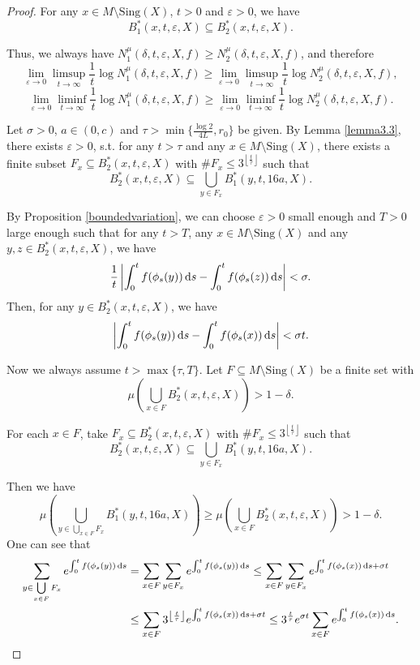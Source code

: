 \documentclass[10pt]{article}
\newtheorem*{Theorem A}{Theorem A}
\begin{document}
\begin{proof} For any \( x \in M \setminus \text{Sing}(X) \), \( t > 0 \) and \( \varepsilon > 0 \), we have
\[
B_1^*(x, t, \varepsilon, X) \subseteq B_2^*(x, t, \varepsilon, X).
\]

\noindent
Thus, we always have \( N_1^\mu(\delta, t, \varepsilon, X, f) \geq N_2^\mu(\delta, t, \varepsilon, X, f) \), and therefore
\[
\lim_{\varepsilon \to 0} \limsup_{t \to \infty} \frac{1}{t} \log N_1^\mu(\delta, t, \varepsilon, X, f) \geq \lim_{\varepsilon \to 0} \limsup_{t \to \infty} \frac{1}{t} \log N_2^\mu(\delta, t, \varepsilon, X, f),
\]
\[
\lim_{\varepsilon \to 0} \liminf_{t \to \infty} \frac{1}{t} \log N_1^\mu(\delta, t, \varepsilon, X, f) \geq \lim_{\varepsilon \to 0} \liminf_{t \to \infty} \frac{1}{t} \log N_2^\mu(\delta, t, \varepsilon, X, f).
\]

Let \( \sigma > 0 \), \(a\in(0,c)\) and  \( \tau > \min\{\frac{\log 2}{4L}, r_0\} \) be given. By Lemma \ref{lemma3.3}, there exists \( \varepsilon > 0 \), s.t. for any \( t > \tau \) and any \( x \in M \setminus \text{Sing}(X) \), there exists a finite subset \( F_x \subseteq B_2^*(x, t, \varepsilon, X) \) with \( \#F_x \leq 3^{\left\lfloor \frac{t}{\tau} \right\rfloor} \) such that
\[
B_2^*(x, t, \varepsilon, X) \subseteq \bigcup_{y \in F_x} B_1^*(y, t, 16a, X).
\]

By Proposition \ref{boundedvariation}, we can choose \( \varepsilon > 0 \) small enough and \( T>0\) large enough such that for any \( t > T \),  any \( x \in M \setminus \text{Sing}(X) \) and any \( y, z \in B_2^*(x, t, \varepsilon, X) \), we have
\[
\frac{1}{t}\left| \int_0^t f(\phi_s(y)) \, {\rm d}s - \int_0^t f(\phi_s(z)) \, {\rm d}s \right| < \sigma.
\]
Then, for any \( y \in B_2^*(x, t, \varepsilon, X) \), we have \[ \left| \int_0^t f(\phi_s(y)) \, {\rm d}s - \int_0^t f(\phi_s(x)) \, {\rm d}s \right| < \sigma t. \]


Now we always assume \( t>\max\{\tau, T\}\). Let \( F \subseteq M \setminus \text{Sing}(X) \) be a finite set with
\[
\mu\left( \bigcup_{x \in F} B_2^*(x, t, \varepsilon, X) \right) > 1 - \delta.
\]

\noindent
For each \( x \in F \), take \( F_x \subseteq B_2^*(x, t, \varepsilon, X) \) with \(\#F_x \leq 3^{\left\lfloor \frac{t}{\tau} \right\rfloor} \) such that
\[
B_2^*(x, t, \varepsilon, X) \subseteq \bigcup_{y \in F_x} B_1^*(y, t, 16a, X).
\]

\noindent
Then we have
\[
\mu\left( \bigcup_{y \in {\bigcup\limits_{x\in F} F_x}} B_1^*(y, t, 16a, X) \right) \geq \mu\left( \bigcup_{x \in F} B_2^*(x, t, \varepsilon, X) \right) > 1 - \delta.
\]
One can see that
\begin{align*}
    \sum_{y \in {\bigcup\limits_{x\in F} F_x}} e^{\int_0^t f(\phi_s(y)) \, {\rm d}s} &= \sum_{x \in F} \sum_{y \in F_x} e^{\int_0^t f(\phi_s(y)) \, {\rm d}s}\leq \sum_{x \in F} \sum_{y \in F_x} e^{\int_0^t f(\phi_s(x)) \, {\rm d}s + \sigma t}\\
    &\leq \sum_{x \in F} 3^{\left\lfloor \frac{t}{\tau} \right\rfloor} e^{\int_0^t f(\phi_s(x)) \, {\rm d}s + \sigma t}\leq 3^{\frac{t}{\tau}} e^{\sigma t} \sum_{x \in F} e^{\int_0^t f(\phi_s(x)) \, {\rm d}s}.
\end{align*}



\end{proof}
\end{document}
